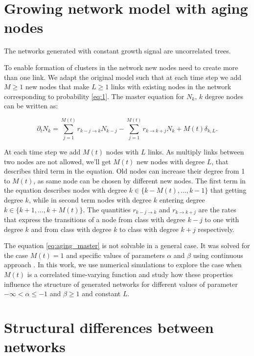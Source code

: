 \section{Growing network model with aging nodes}


The networks generated with constant growth signal are uncorrelated trees. 

To enable formation of clusters in the network new nodes need to create more than one link. We adapt the original model such that at each time step we add $M\geq1$ new nodes that make $L\geq1$ links with existing nodes in the network corresponding to probability \ref{eq:1}. 
The master equation for $N_k$, $k$ degree nodes can be written as:

\begin{equation}
\partial_{t}N_{k}=\sum^{M(t)}_{j=1}r_{k-j\longrightarrow k}N_{k-j}-\sum^{M(t)}_{j=1}r_{k\longrightarrow k+j}N_{k}+M(t)\delta_{k,L} . \label{eq:aging_master}  
\end{equation}

At each time step we add $M(t)$ nodes with $L$ links. As multiply links between two nodes are not allowed, we'll get $M(t)$ new nodes with degree $L$, that describes third term in the equation. Old nodes can increase their degree from 1 to $M(t)$, as same node can be chosen by different new nodes. The first term in the equation describes nodes with degree $k\in\{k-M(t),\ldots, k-1\}$ that getting degree $k$, while in second term nodes with degree $k$ entering degree  $k\in\{k+1,\ldots, k+M(t)\}$. The quantities $r_{k-j\longrightarrow k}$ and $r_{k\longrightarrow k+j}$ are the rates that express the transitions of a node from class with degree $k-j$ to one with degree $k$ and from class with degree $k$ to class with degree $k+j$ respectively. 

The equation \ref{eq:aging_master} is not solvable in a general case. It was solved for the case $M(t)=1$ and specific values of parameters $\alpha$ and $\beta$ using continuous approach \cite{dorogovtsev2001b}. In this work, we use numerical simulations to explore the case when $M(t)$ is a correlated time-varying function and study how these properties influence the structure of generated networks for different values of parameter $-\infty<\alpha\leq-1$ and $\beta\geq1$ and constant $L$.


\section{Structural differences between networks }

